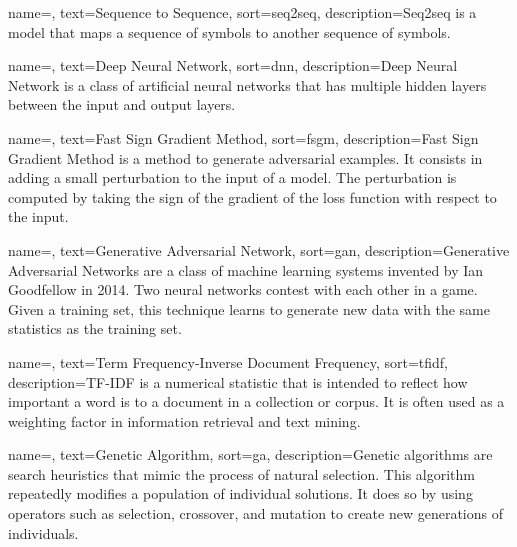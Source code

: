 {
    name=,
    text=Sequence to Sequence,
    sort=seq2seq,
    description={Seq2seq is a model that maps a sequence of symbols to another sequence of symbols.}
}

{
    name=,
    text=Deep Neural Network,
    sort=dnn,
    description={Deep Neural Network is a class of artificial neural networks that has multiple hidden layers between the input and output layers.}
}

{
    name=,
    text=Fast Sign Gradient Method,
    sort=fsgm,
    description={Fast Sign Gradient Method is a method to generate adversarial examples. It consists in adding a small perturbation to the input of a model. The perturbation is computed by taking the sign of the gradient of the loss function with respect to the input.}
}

{
    name=,
    text=Generative Adversarial Network,
    sort=gan,
    description={Generative Adversarial Networks are a class of machine learning systems invented by Ian Goodfellow in 2014. Two neural networks contest with each other in a game. Given a training set, this technique learns to generate new data with the same statistics as the training set.}
}


{
    name=,
    text=Term Frequency-Inverse Document Frequency,
    sort=tfidf,
    description={TF-IDF is a numerical statistic that is intended to reflect how important a word is to a document in a collection or corpus. It is often used as a weighting factor in information retrieval and text mining.}
}

{
    name=,
    text=Genetic Algorithm,
    sort=ga,
    description={Genetic algorithms are search heuristics that mimic the process of natural selection. This algorithm repeatedly modifies a population of individual solutions. It does so by using operators such as selection, crossover, and mutation to create new generations of individuals.}
}

